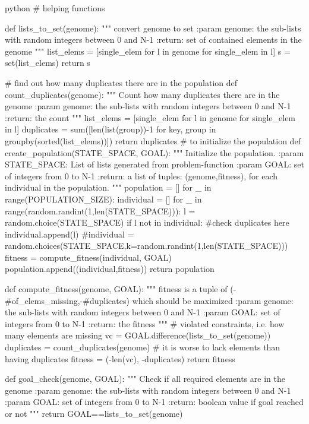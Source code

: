 \begin{mintedbox}{python}
  # helping functions

def lists_to_set(genome):
    """
    convert genome to set
    :param genome: the sub-lists with random integers between 0 and N-1
    :return: set of contained elements in the genome
    """
    list_elems = [single_elem for l in genome for single_elem in l]
    s = set(list_elems)
    return s

# find out how many duplicates there are in the population
def count_duplicates(genome):
    """
    Count how many duplicates there are in the genome
    :param genome: the sub-lists with random integers between 0 and N-1
    :return: the count
    """
    list_elems = [single_elem for l in genome for single_elem in l]
    duplicates = sum([len(list(group))-1 for key, group in groupby(sorted(list_elems))])
    return duplicates
# to initialize the population
def create_population(STATE_SPACE, GOAL):
    """
    Initialize the population.
    :param STATE_SPACE: List of lists generated from problem-function
    :param GOAL: set of integers from 0 to N-1
    :return: a list of tuples: (genome,fitness), for each individual in the population.
    """
    population = []
    for _ in range(POPULATION_SIZE):
        individual = []
        for _ in range(random.randint(1,len(STATE_SPACE))):
            l = random.choice(STATE_SPACE)
            if l not in individual: #check duplicates here
                individual.append(l)
        #individual = random.choices(STATE_SPACE,k=random.randint(1,len(STATE_SPACE)))
        fitness = compute_fitness(individual, GOAL)
        population.append((individual,fitness))
    return population

def compute_fitness(genome, GOAL):
    """
    fitness is a tuple of (-#of_elems_missing,-#duplicates) which should be maximized
    :param genome: the sub-lists with random integers between 0 and N-1
    :param GOAL: set of integers from 0 to N-1
    :return: the fitness
    """
    # violated constraints, i.e. how many elements are missing
    vc = GOAL.difference(lists_to_set(genome))
    duplicates = count_duplicates(genome)
    # it is worse to lack elements than having duplicates
    fitness = (-len(vc), -duplicates)
    return fitness

def goal_check(genome, GOAL):
    """
    Check if all required elements are in the genome
    :param genome: the sub-lists with random integers between 0 and N-1
    :param GOAL: set of integers from 0 to N-1
    :return: boolean value if goal reached or not
    """
    return GOAL==lists_to_set(genome)


\end{mintedbox}

